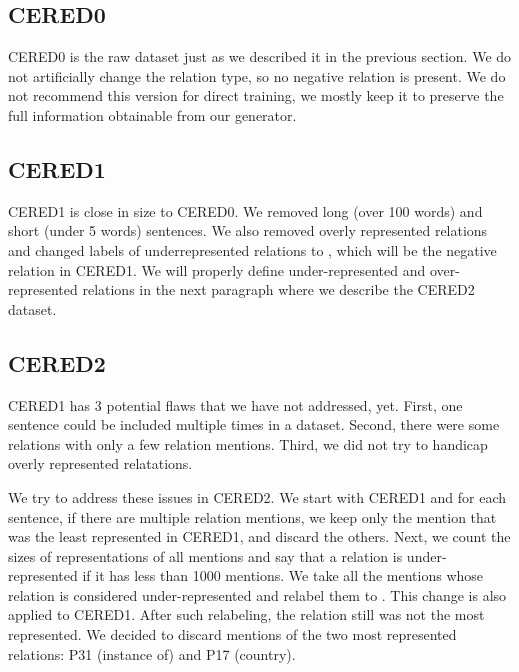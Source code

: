 \subsection{CERED0}
CERED0 is the raw dataset just as we described it in the previous section. We do not artificially change the relation type, so no negative relation is present. We do not recommend this version for direct training, we mostly keep it to preserve the full information obtainable from our generator.

\subsection{CERED1}
CERED1 is close in size to CERED0. We removed long (over 100 words) and short (under 5 words) sentences. We also removed overly represented relations and changed labels of underrepresented relations to , which will be the negative relation in CERED1. We will properly define under-represented and over-represented relations in the next paragraph where we describe the CERED2 dataset.

\subsection{CERED2}

CERED1 has 3 potential flaws that we have not addressed, yet. First, one sentence could be included multiple times in a dataset. Second, there were some relations with only a few relation mentions. Third, we did not try to handicap overly represented relatations. 

We try to address these issues in CERED2. We start with CERED1 and for each sentence, if there are multiple relation mentions, we keep only the mention that was the least represented in CERED1, and discard the others. Next, we count the sizes of representations of all mentions and say that a relation is under-represented if it has less than 1000 mentions. We take all the mentions whose relation is considered under-represented and relabel them to . This change is also applied to CERED1. After such relabeling, the  relation still was not the most represented. We decided to discard mentions of the two most represented relations: P31 (instance of) and P17 (country). 

